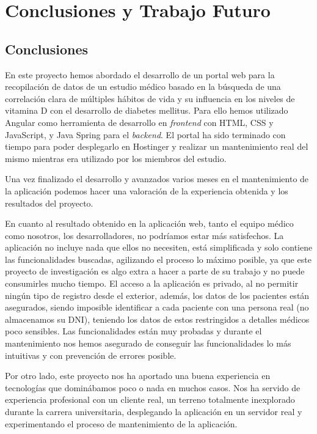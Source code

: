\chapter{Conclusiones y Trabajo Futuro}
    \section{Conclusiones}
    En este proyecto hemos abordado el desarrollo de un portal web para la recopilación de datos de un estudio médico basado en la búsqueda de una correlación clara de múltiples hábitos de vida y su influencia en los niveles de vitamina D con el desarrollo de diabetes mellitus. Para ello hemos utilizado Angular como herramienta de desarrollo en \textit{frontend} con HTML, CSS y JavaScript, y Java Spring para el \textit{backend}. El portal ha sido terminado con tiempo para poder desplegarlo en Hostinger y realizar un mantenimiento real del mismo mientras era utilizado por los miembros del estudio. \newline
    
    Una vez finalizado el desarrollo y avanzados varios meses en el mantenimiento de la aplicación podemos hacer una valoración de la experiencia obtenida y los resultados del proyecto.
    \newline
    
    En cuanto al resultado obtenido en la aplicación web, tanto el equipo médico como nosotros, los desarrolladores, no podríamos estar más satisfechos. La aplicación no incluye nada que ellos no necesiten, está simplificada y solo contiene las funcionalidades buscadas, agilizando el proceso lo máximo posible, ya que este proyecto de investigación es algo extra a hacer a parte de su trabajo y no puede consumirles mucho tiempo.   El acceso a la aplicación es privado, al no permitir ningún tipo de registro desde el exterior, además, los datos de los pacientes están asegurados, siendo imposible identificar a cada paciente con una persona real (no almacenamos su DNI), teniendo los datos de estos restringidos a detalles médicos poco sensibles. Las funcionalidades están muy probadas y durante el mantenimiento nos hemos asegurado de conseguir las funcionalidades lo más intuitivas y con prevención de errores posible.
    \newline
    
    Por otro lado, este proyecto nos ha aportado una buena experiencia en tecnologías que dominábamos poco o nada en muchos casos. Nos ha servido de experiencia profesional con un cliente real, un terreno totalmente inexplorado durante la carrera universitaria, desplegando la aplicación en un servidor real y experimentando el proceso de mantenimiento de la aplicación.
    \newline
    

